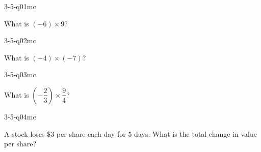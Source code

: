 

\begin{practiceQuestion}{3-5-q01}{mc}
\begin{questionText}
What is $(-6) \times 9$?
\end{questionText}
\end{practiceQuestion}

\begin{practiceQuestion}{3-5-q02}{mc}
\begin{questionText}
What is $(-4) \times (-7)$?
\end{questionText}
\end{practiceQuestion}

\begin{practiceQuestion}{3-5-q03}{mc}
\begin{questionText}
What is $\left(-\dfrac{2}{3}\right) \times \dfrac{9}{4}$?
\end{questionText}
\end{practiceQuestion}

\begin{practiceQuestion}{3-5-q04}{mc}
\begin{questionText}
A stock loses $\$3$ per share each day for $5$ days. What is the total change in value per share?
\end{questionText}
\end{practiceQuestion}

